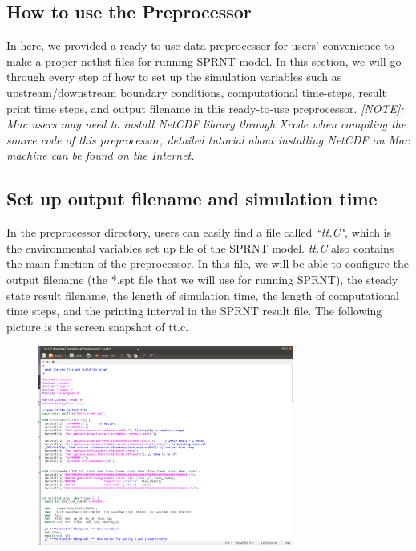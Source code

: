 \documentclass[12pt, letterpaper]{article}
\begin{document}
\begin{appendices}
\section{How to use the Preprocessor}
\label{sec:HtuP}
\begin{flushleft} %

In here, we provided a ready-to-use data preprocessor for users' convenience to make a proper netlist files for running SPRNT model. 
In this section, we will go through every step of how to set up the simulation variables such as upstream/downstream boundary conditions, computational time-steps, result print time steps, and output filename in this ready-to-use preprocessor. \newline
\newline
\emph{[NOTE]: Mac users may need to install NetCDF library through Xcode when compiling the source code of this preprocessor, detailed tutorial about installing NetCDF on Mac machine can be found on the Internet.}

\subsection*{Set up output filename and simulation time}
In the preprocessor directory, users can easily find a file called \emph{``tt.C"}, which is the environmental variables set up file of the SPRNT model. \emph{tt.C} also contains the main function of the preprocessor. \newline 
In this file, we will be able to configure the output filename (the *.spt file that we will use for running SPRNT), the steady state result filename, the length of simulation time, the length of computational time steps, and the printing interval in the SPRNT result file. The following picture is the screen snapshot of tt.c. 

\begin{figure}[H]
	\centering
	\includegraphics[width = 0.75\textwidth]{figure/tt.png} %
	\label{fig:process}%
\end{figure}


\end{flushleft}
\end{appendices}
\end{document}
